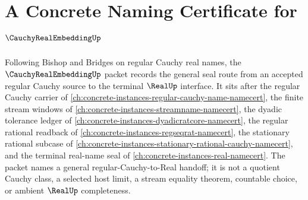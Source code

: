 \chapter{A Concrete Naming Certificate for $\CauchyRealEmbeddingUp$}
\label{ch:concrete-instances-cauchy-real-embedding-namecert}

Following Bishop and Bridges on regular Cauchy real names, the $\CauchyRealEmbeddingUp$ packet records the general seal route from an accepted regular Cauchy source to the terminal $\RealUp$ interface. It sits after the regular Cauchy carrier of \autoref{ch:concrete-instances-regular-cauchy-name-namecert}, the finite stream windows of \autoref{ch:concrete-instances-streamname-namecert}, the dyadic tolerance ledger of \autoref{ch:concrete-instances-dyadicratcore-namecert}, the regular rational readback of \autoref{ch:concrete-instances-regseqrat-namecert}, the stationary rational subcase of \autoref{ch:concrete-instances-stationary-rational-cauchy-namecert}, and the terminal real-name seal of \autoref{ch:concrete-instances-real-namecert}. The packet names a general regular-Cauchy-to-Real handoff; it is not a quotient Cauchy class, a selected host limit, a stream equality theorem, countable choice, or ambient $\RealUp$ completeness.


